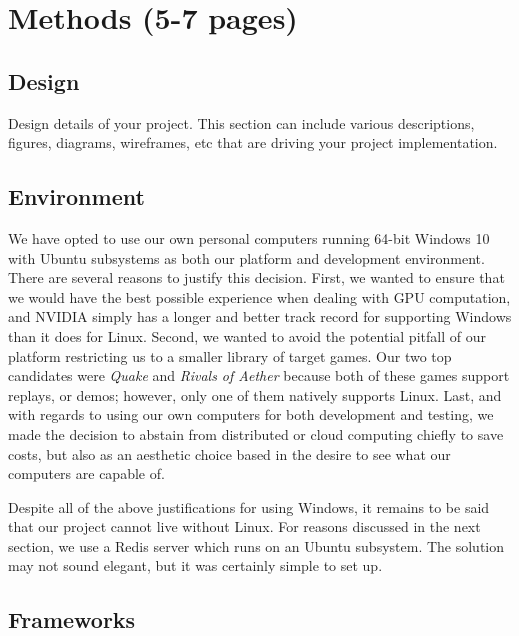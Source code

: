 \chapter{Methods (5-7 pages)}


\section{Design}

Design details of your project. This section can include various descriptions, figures, diagrams, wireframes, etc that are driving your project implementation.




\section{Environment}

We have opted to use our own personal computers running 64-bit Windows 10 with Ubuntu subsystems as both our platform and development environment. There are several reasons to justify this decision. First, we wanted to ensure that we would have the best possible experience when dealing with GPU computation, and NVIDIA simply has a longer and better track record for supporting Windows than it does for Linux. Second, we wanted to avoid the potential pitfall of our platform restricting us to a smaller library of target games. Our two top candidates were {\it Quake} and {\it Rivals of Aether} because both of these games support replays, or demos; however, only one of them natively supports Linux. Last, and with regards to using our own computers for both development and testing, we made the decision to abstain from distributed or cloud computing chiefly to save costs, but also as an aesthetic choice based in the desire to see what our computers are capable of.

Despite all of the above justifications for using Windows, it remains to be said that our project cannot live without Linux. For reasons discussed in the next section, we use a Redis server which runs on an Ubuntu subsystem. The solution may not sound elegant, but it was certainly simple to set up.




\section{Frameworks}

